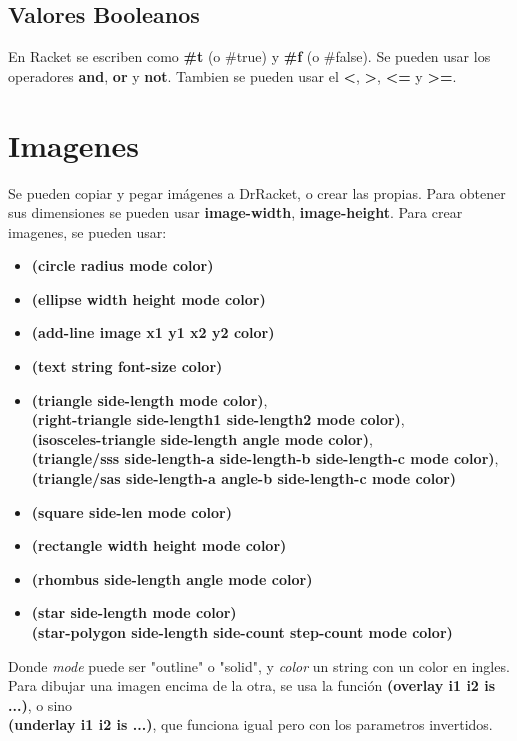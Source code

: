 \documentclass[11pt,a4paper]{article}
\begin{document}
\subsection{Valores Booleanos}
En Racket se escriben como \textbf{\#t} (o \#true) y \textbf{\#f} (o \#false). Se pueden usar los operadores \textbf{and}, \textbf{or} y \textbf{not}. Tambien se pueden usar el \textbf{<}, \textbf{>}, \textbf{<=} y \textbf{>=}.

\section{Imagenes}
Se pueden copiar y pegar imágenes a DrRacket, o crear las propias. Para obtener sus dimensiones se pueden usar \textbf{image-width}, \textbf{image-height}. Para crear imagenes, se pueden usar:
\begin{itemize}
\item \textbf{(circle radius mode color)}
\item \textbf{(ellipse width height mode color)}
\item \textbf{(add-line image x1 y1 x2 y2 color)}
\item \textbf{(text string font-size color)}
\item \textbf{(triangle side-length mode color)},\\ \textbf{(right-triangle side-length1 side-length2 mode color)},\\ \textbf{(isosceles-triangle side-length angle mode color)},\\ \textbf{(triangle/sss side-length-a side-length-b side-length-c mode color)},\\ \textbf{(triangle/sas side-length-a angle-b side-length-c mode color)}
\item \textbf{(square side-len mode color)}
\item \textbf{(rectangle width height mode color)}
\item \textbf{(rhombus side-length angle mode color)}
\item \textbf{(star side-length mode color)}\\ \textbf{(star-polygon side-length side-count step-count mode color)}
\end{itemize}

Donde \textit{mode} puede ser "outline" o "solid", y \textit{color} un string con un color en ingles.\\

Para dibujar una imagen encima de la otra, se usa la funci\'on \textbf{(overlay i1 i2 is ...)}, o sino\\ \textbf{(underlay i1 i2 is ...)}, que funciona igual pero con los parametros invertidos.\\
\end{document}
